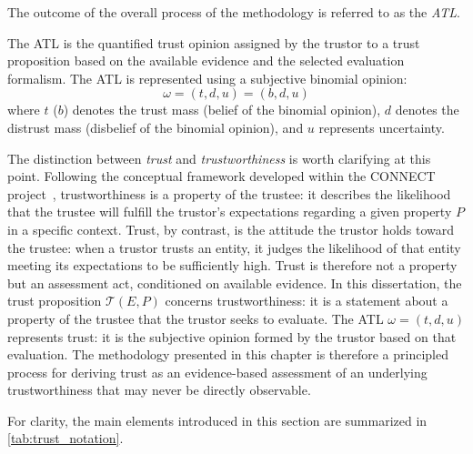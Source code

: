 The outcome of the overall process of the methodology is referred to as the \emph{\acf{ATL}}.
\begin{definition}
The \ac{ATL} is the quantified trust opinion assigned by the trustor to a trust proposition based on the available evidence and the selected evaluation formalism. The \ac{ATL} is represented using a subjective binomial opinion:
\[
\omega = (t, d, u) = (b, d, u) 
\]
where $t$ ($b$) denotes the trust mass (belief of the binomial opinion), $d$ denotes the distrust mass (disbelief of the binomial opinion), and $u$ represents uncertainty. 
\end{definition}



The distinction between \emph{trust} and \emph{trustworthiness} is worth clarifying at this point. Following the conceptual framework developed within the CONNECT project~\cite{connect_d21_taf}, trustworthiness is a property of the trustee: it describes the likelihood that the trustee will fulfill the trustor's expectations regarding a given property $P$ in a specific context. Trust, by contrast, is the attitude the trustor holds toward the trustee: when a trustor trusts an entity, it judges the likelihood of that entity meeting its expectations to be sufficiently high. Trust is therefore not a property but an assessment act, conditioned on available evidence. In this dissertation, the trust proposition $\mathcal{T}(E, P)$ concerns trustworthiness: it is a statement about a property of the trustee that the trustor seeks to evaluate. The \ac{ATL} $\omega = (t, d, u)$ represents trust: it is the subjective opinion formed by the trustor based on that evaluation. The methodology presented in this chapter is therefore a principled process for deriving trust as an evidence-based assessment of an underlying trustworthiness that may never be directly observable.

For clarity, the main elements introduced in this section are summarized in \cref{tab:trust_notation}.

